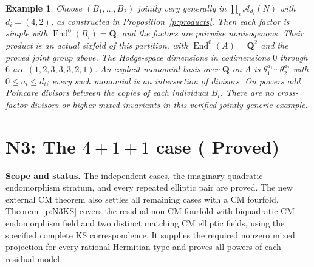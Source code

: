 \documentclass[10pt,reqno]{article}
\theoremstyle{emphasizedplain}
\DeclareRobustCommand{\provedstatus}{%
  \texorpdfstring{\textcolor{ProvedGreen}{\textbf{Proved}}}{Proved}}
\theoremstyle{emphasizeddefinition}
\newtheorem{example}[theorem]{Example}
\theoremstyle{emphasizeddefinition}
\DeclareMathOperator{\End}{End}
\newcommand{\Q}{\mathbf Q}
\newcommand{\status}[1]{%
  \par\nobreak\smallskip\noindent
  {\setlength{\fboxsep}{7pt}%
   \colorbox{ScopeBackground}{%
    \parbox{\dimexpr\linewidth-2\fboxsep\relax}{%
     \small\textbf{\textcolor{HeadingInk}{Scope and status.}} #1}}}%
  \par\nobreak\medskip}
\renewcommand{\small}{\fontsize{8.4}{10}\selectfont}
\begin{document}
\begin{example}
Choose $(B_1,\ldots,B_{2})$ jointly very generally in
$\prod_i\mathcal A_{d_i}(N)$ with $d_i=(4,2)$,
as constructed in Proposition~\ref{p:products}. Then each factor is
simple with $\End^0(B_i)=\Q$, and the factors are pairwise nonisogenous.
Their product is an actual sixfold of this partition, with
$\End^0(A)=\Q^{2}$ and the proved joint group above.
The Hodge-space dimensions in codimensions $0$ through $6$ are
$(1,2,3,3,3,2,1)$.
An explicit monomial basis over $\Q$ on $A$ is
$\theta_1^{a_1}\cdots\theta_{2}^{a_{2}}$ with
$0\leq a_i\leq d_i$; every such monomial is an intersection of divisors.
On powers add Poincare divisors between the copies of each individual
$B_i$. There are no cross-factor divisors or higher mixed invariants in
this verified jointly generic example.
\end{example}
\section{N3: The \texorpdfstring{$4+1+1$}{4+1+1} case (\provedstatus)}\label{sec:N3}

\status{The independent cases, the imaginary-quadratic endomorphism
stratum, and every repeated elliptic pair are proved. The new external
CM theorem also settles all remaining cases with a CM fourfold.
Theorem~\ref{p:N3KS} covers the residual non-CM fourfold with
biquadratic CM endomorphism field and two distinct matching CM
elliptic fields, using the specified complete KS correspondence.
It supplies the required nonzero mixed projection for every rational
Hermitian type and proves all powers of each residual model.}
\end{document}
